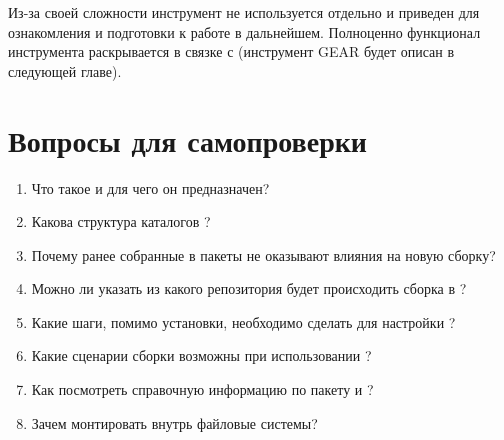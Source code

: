 Из-за своей сложности инструмент не используется отдельно и приведен для ознакомления и
подготовки к работе в дальнейшем. Полноценно функционал инструмента раскрывается в связке
с  (инструмент GEAR будет описан в следующей главе).

\section{Вопросы для самопроверки}

\begin{enumerate}
	\item Что такое  и для чего он предназначен?
	\item Какова структура каталогов ?
	\item Почему ранее собранные в  пакеты не оказывают влияния на новую сборку?
	\item Можно ли указать из какого репозитория будет происходить сборка в ?
	\item Какие шаги, помимо установки, необходимо сделать для настройки ?
	\item Какие сценарии сборки возможны при использовании ?
	\item Как посмотреть справочную информацию по пакету  и ?
	\item Зачем монтировать внутрь  файловые системы?
\end{enumerate}
